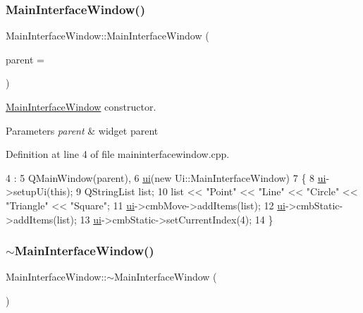 \subsubsection{\texorpdfstring{Main\+Interface\+Window()}{MainInterfaceWindow()}}
{\footnotesize\ttfamily Main\+Interface\+Window\+::\+Main\+Interface\+Window (\begin{DoxyParamCaption}\item[{Q\+Widget $\ast$}]{parent = {} }\end{DoxyParamCaption})\hspace{0.3cm}{\ttfamily [explicit]}}



\hyperlink{class_main_interface_window}{Main\+Interface\+Window} constructor. 


\begin{DoxyParams}{Parameters}
{\em parent} & widget parent \\
\hline
\end{DoxyParams}


Definition at line 4 of file maininterfacewindow.\+cpp.


\begin{DoxyCode}
4                                                         :
5     QMainWindow(parent),
6     \hyperlink{class_main_interface_window_afe3aae95d697ade063b0e4ad517655b9}{ui}(\textcolor{keyword}{new} Ui::MainInterfaceWindow)
7 \{
8     \hyperlink{class_main_interface_window_afe3aae95d697ade063b0e4ad517655b9}{ui}->setupUi(\textcolor{keyword}{this});
9     QStringList list;
10     list << \textcolor{stringliteral}{"Point"} << \textcolor{stringliteral}{"Line"} << \textcolor{stringliteral}{"Circle"} << \textcolor{stringliteral}{"Triangle"} << \textcolor{stringliteral}{"Square"};
11     \hyperlink{class_main_interface_window_afe3aae95d697ade063b0e4ad517655b9}{ui}->cmbMove->addItems(list);
12     \hyperlink{class_main_interface_window_afe3aae95d697ade063b0e4ad517655b9}{ui}->cmbStatic->addItems(list);
13     \hyperlink{class_main_interface_window_afe3aae95d697ade063b0e4ad517655b9}{ui}->cmbStatic->setCurrentIndex(4);
14 \}
\end{DoxyCode}
\mbox{\label{class_main_interface_window_a774d48e98f706047f8f12f5f961450d3}} 
\subsubsection{\texorpdfstring{$\sim$\+Main\+Interface\+Window()}{~MainInterfaceWindow()}}
{\footnotesize\ttfamily Main\+Interface\+Window\+::$\sim$\+Main\+Interface\+Window (\begin{DoxyParamCaption}{ }\end{DoxyParamCaption})}



